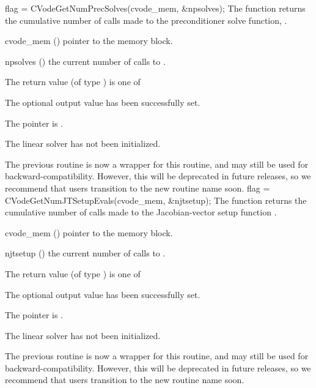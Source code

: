 {
  flag = CVodeGetNumPrecSolves(cvode\_mem, \&npsolves);
}
{
  The function  returns the
  cumulative number of calls made to the preconditioner
  solve function, .
}
{
  \begin{args}
  \item[cvode\_mem] ()
    pointer to the {\cvode} memory block.
  \item[npsolves] ()
    the current number of calls to .
  \end{args}
}
{
  The return value  (of type ) is one of
  \begin{args}
  \item[\Id{CVLS\_SUCCESS}]
    The optional output value has been successfully set.
  \item[\Id{CVLS\_MEM\_NULL}]
    The  pointer is .
  \item[\Id{CVLS\_LMEM\_NULL}]
    The {\cvls} linear solver has not been initialized.
  \end{args}
}
{
  The previous routine  is now a wrapper for
  this routine, and may still be used for backward-compatibility.
  However, this will be deprecated in future releases, so we recommend
  that users transition to the new routine name soon.
}
{
  flag = CVodeGetNumJTSetupEvals(cvode\_mem, \&njtsetup);
}
{
  The function  returns the
  cumulative number of calls made to the Jacobian-vector setup
  function .
}
{
  \begin{args}
  \item[cvode\_mem] ()
    pointer to the {\cvode} memory block.
  \item[njtsetup] ()
    the current number of calls to .
  \end{args}
}
{
  The return value  (of type ) is one of
  \begin{args}
  \item[\Id{CVLS\_SUCCESS}]
    The optional output value has been successfully set.
  \item[\Id{CVLS\_MEM\_NULL}]
    The  pointer is .
  \item[\Id{CVLS\_LMEM\_NULL}]
    The {\cvls} linear solver has not been initialized.
  \end{args}
}
{
  The previous routine  is now a wrapper for
  this routine, and may still be used for backward-compatibility.
  However, this will be deprecated in future releases, so we recommend
  that users transition to the new routine name soon.
}
